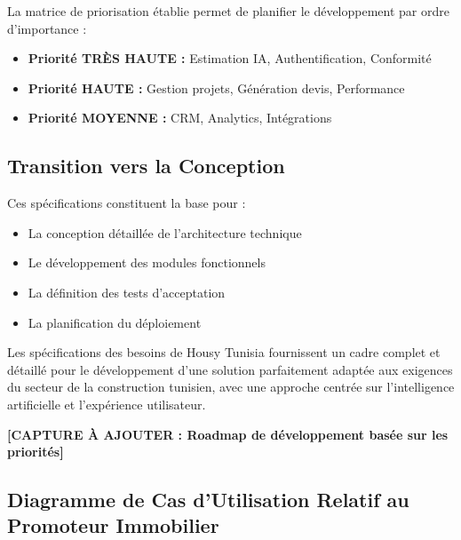 La matrice de priorisation établie permet de planifier le développement par ordre d'importance :

\begin{itemize}
    \item \textbf{Priorité TRÈS HAUTE :} Estimation IA, Authentification, Conformité
    \item \textbf{Priorité HAUTE :} Gestion projets, Génération devis, Performance
    \item \textbf{Priorité MOYENNE :} CRM, Analytics, Intégrations
\end{itemize}

\subsection{Transition vers la Conception}

Ces spécifications constituent la base pour :
\begin{itemize}
    \item La conception détaillée de l'architecture technique
    \item Le développement des modules fonctionnels
    \item La définition des tests d'acceptation
    \item La planification du déploiement
\end{itemize}

\begin{resultbox}
Les spécifications des besoins de Housy Tunisia fournissent un cadre complet et détaillé pour le développement d'une solution parfaitement adaptée aux exigences du secteur de la construction tunisien, avec une approche centrée sur l'intelligence artificielle et l'expérience utilisateur.
\end{resultbox}

\textbf{[CAPTURE À AJOUTER : Roadmap de développement basée sur les priorités]}


\subsection{Diagramme de Cas d'Utilisation Relatif au Promoteur Immobilier}

